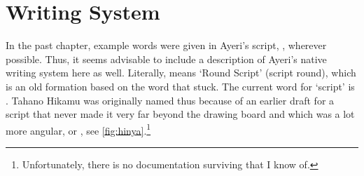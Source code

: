 
\chapter{Writing System}

In the past chapter, example words were given in Ayeri's script, , wherever possible. Thus, it seems advisable to include a 
description of Ayeri's native writing system here as well. Literally, 
 means `Round Script' (script round), which is 
an old formation based on the word  that  stuck. The 
current word for `script' is . Tahano Hikamu was 
originally named thus because of an earlier draft for a script that never made 
it very far beyond the drawing board and which was a lot more angular, or 
, see \autoref{fig:hinya}.\footnote{Unfortunately, there is 
no documentation surviving that I know of.}


